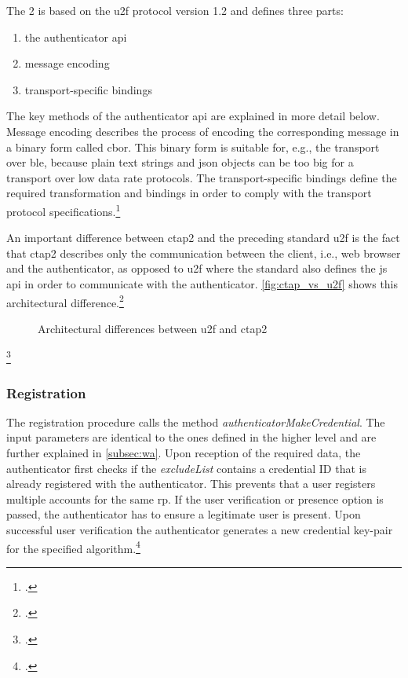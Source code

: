 The  2 is based on the \gls{u2f} protocol version 1.2 and defines three parts:

\begin{enumerate}
	\item the authenticator \gls{api}
	\item message encoding
	\item transport-specific bindings
\end{enumerate}

The key methods of the authenticator \gls{api} are explained in more detail below. Message encoding describes the process of encoding the corresponding message in a binary form called \gls{cbor}. This binary form is suitable for, e.g., the transport over \gls{ble}, because plain text strings and \gls{json} objects can be too big for a transport over low data rate protocols. The transport-specific bindings define the required transformation and bindings in order to comply with the transport protocol specifications.\footcites[See][4--5]{ctap2}

An important difference between \gls{ctap}2 and the preceding standard \gls{u2f} is the fact that \gls{ctap}2 describes only the communication between the client, i.e., web browser and the authenticator, as opposed to \gls{u2f} where the standard also defines the \gls{js} \gls{api} in order to communicate with the authenticator. \autoref{fig:ctap_vs_u2f} shows this architectural difference.\footcites[See][51]{kim-new-way-fido}[See][254]{Schwartz2018}

\begin{figure}[hbt]
	\centering
	
	\caption[Architectural differences between \gls{u2f} and \gls{ctap}2]{Architectural differences between \gls{u2f} and \gls{ctap}2\footnotemark}
	\label{fig:ctap_vs_u2f}
\end{figure}
\footcitetexts[Source: diagram by author, based on][4]{u2f-overview}[][Chapter 6]{w3c}

\newpage

\subsubsection{Registration}

The registration procedure calls the method \textit{authenticatorMakeCredential}. The input parameters are identical to the ones defined in the higher level \wa{} and are further explained in \autoref{subsec:wa}. Upon reception of the required data, the authenticator first checks if the \textit{excludeList} contains a credential ID that is already registered with the authenticator. This prevents that a user registers multiple accounts for the same \gls{rp}. If the user verification or presence option is passed, the authenticator has to ensure a legitimate user is present. Upon successful user verification the authenticator generates a new credential key-pair for the specified algorithm.\footcites[See][9]{ctap2}

